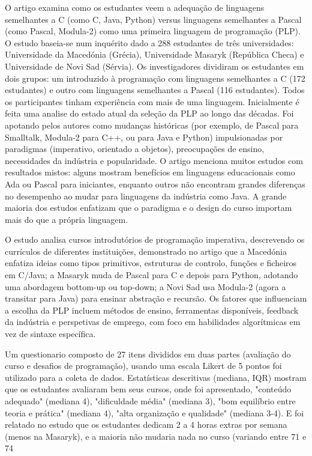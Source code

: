 \documentclass[12pt,a4paper,oneside]{abntex2}
\begin{document}
O artigo examina como os estudantes veem a adequação de linguagens semelhantes a C (como C, Java, Python) versus linguagens semelhantes a Pascal (como Pascal, Modula-2) como uma primeira linguagem de programação (PLP). O estudo baseia-se num inquérito dado a 288 estudantes de três universidades: Universidade da Macedónia (Grécia), Universidade Masaryk (República Checa) e Universidade de Novi Sad (Sérvia). Os investigadores dividiram os estudantes em dois grupos: um introduzido à programação com linguagens semelhantes a C (172 estudantes) e outro com linguagens semelhantes a Pascal (116 estudantes). Todos os participantes tinham experiência com mais de uma linguagem. Inicialmente é feita uma analise do estado atual da seleção da PLP ao longo das décadas. Foi apotando pelos autores como mudanças históricas (por exemplo, de Pascal para Smalltalk, Modula-2 para C++, ou para Java e Python) impulsionadas por paradigmas (imperativo, orientado a objetos), preocupações de ensino, necessidades da indústria e popularidade. O artigo menciona muitos estudos com resultados mistos: alguns mostram benefícios em linguagens educacionais como Ada ou Pascal para iniciantes, enquanto outros não encontram grandes diferenças no desempenho ao mudar para linguagens da indústria como Java. A grande maioria dos estudos enfatizam que o paradigma e o design do curso importam mais do que a própria linguagem.

O estudo analisa cursos introdutórios de programação imperativa, descrevendo os currículos de diferentes instituições, demonstrado no artigo que a Macedónia enfatiza ideias como tipos primitivos, estruturas de controlo, funções e ficheiros em C/Java; a Masaryk muda de Pascal para C e depois para Python, adotando uma abordagem bottom-up ou top-down; a Novi Sad usa Modula-2 (agora a transitar para Java) para ensinar abstração e recursão. Os fatores que influenciam a escolha da PLP incluem métodos de ensino, ferramentas disponíveis, feedback da indústria e perspetivas de emprego, com foco em habilidades algorítmicas em vez de sintaxe específica.

Um questionario composto de 27 itens divididos em duas partes (avaliação do curso e desafios de programação), usando uma escala Likert de 5 pontos foi utilizado para a coleta de dados. Estatísticas descritivas (mediana, IQR) mostram que os estudantes avaliaram bem seus cursos, onde foi apresentado, "conteúdo adequado" (mediana 4), "dificuldade média" (mediana 3), "bom equilíbrio entre teoria e prática" (mediana 4), "alta organização e qualidade" (mediana 3-4). E foi relatado no estudo que os estudantes dedicam 2 a 4 horas extras por semana (menos na Masaryk), e a maioria não mudaria nada no curso (variando entre 71 e 74%
\end{document}
